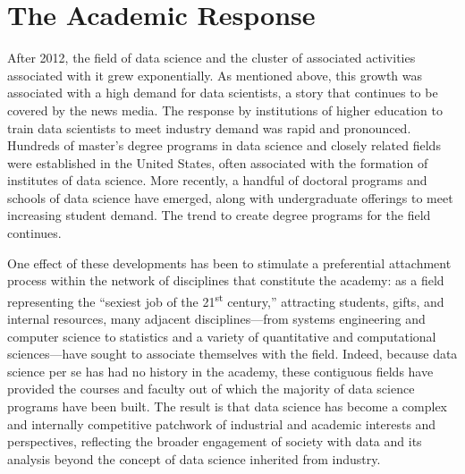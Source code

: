 \documentclass[
  letterpaper,
]{report}
\begin{document}
\hypertarget{the-academic-response}{%
\section{The Academic Response}\label{the-academic-response}}

After 2012, the field of data science and the cluster of associated
activities associated with it grew exponentially. As mentioned above,
this growth was associated with a high demand for data scientists, a
story that continues to be covered by the news media. The response by
institutions of higher education to train data scientists to meet
industry demand was rapid and pronounced. Hundreds of master's degree
programs in data science and closely related fields were established in
the United States, often associated with the formation of institutes of
data science. More recently, a handful of doctoral programs and schools
of data science have emerged, along with undergraduate offerings to meet
increasing student demand. The trend to create degree programs for the
field continues.

One effect of these developments has been to stimulate a preferential
attachment process within the network of disciplines that constitute the
academy: as a field representing the ``sexiest job of the
21\textsuperscript{st} century,'' attracting students, gifts, and
internal resources, many adjacent disciplines---from systems engineering
and computer science to statistics and a variety of quantitative and
computational sciences---have sought to associate themselves with the
field. Indeed, because data science per se has had no history in the
academy, these contiguous fields have provided the courses and faculty
out of which the majority of data science programs have been built. The
result is that data science has become a complex and internally
competitive patchwork of industrial and academic interests and
perspectives, reflecting the broader engagement of society with data and
its analysis beyond the concept of data science inherited from industry.
\end{document}
